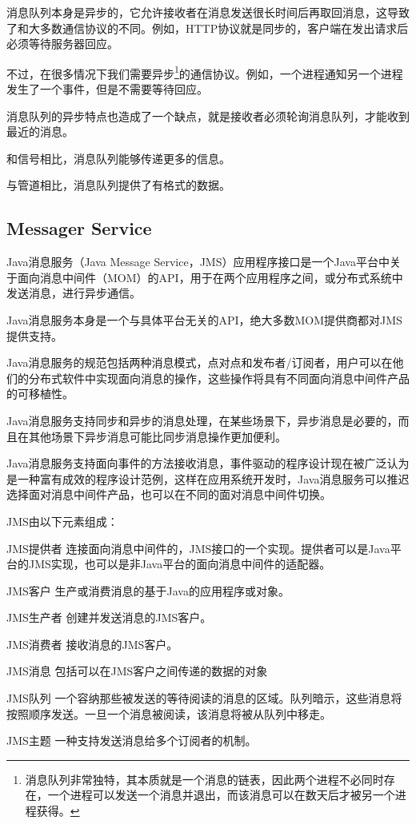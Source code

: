 消息队列本身是异步的，它允许接收者在消息发送很长时间后再取回消息，这导致了和大多数通信协议的不同。例如，HTTP协议就是同步的，客户端在发出请求后必须等待服务器回应。

不过，在很多情况下我们需要异步\footnote{消息队列非常独特，其本质就是一个消息的链表，因此两个进程不必同时存在，一个进程可以发送一个消息并退出，而该消息可以在数天后才被另一个进程获得。}的通信协议。例如，一个进程通知另一个进程发生了一个事件，但是不需要等待回应。

消息队列的异步特点也造成了一个缺点，就是接收者必须轮询消息队列，才能收到最近的消息。

\begin{compactitem}
\item 和信号相比，消息队列能够传递更多的信息。
\item 与管道相比，消息队列提供了有格式的数据。
\end{compactitem}


\subsection{Messager Service}

Java消息服务（Java Message Service，JMS）应用程序接口是一个Java平台中关于面向消息中间件（MOM）的API，用于在两个应用程序之间，或分布式系统中发送消息，进行异步通信。

Java消息服务本身是一个与具体平台无关的API，绝大多数MOM提供商都对JMS提供支持。

Java消息服务的规范包括两种消息模式，点对点和发布者/订阅者，用户可以在他们的分布式软件中实现面向消息的操作，这些操作将具有不同面向消息中间件产品的可移植性。

Java消息服务支持同步和异步的消息处理，在某些场景下，异步消息是必要的，而且在其他场景下异步消息可能比同步消息操作更加便利。

Java消息服务支持面向事件的方法接收消息，事件驱动的程序设计现在被广泛认为是一种富有成效的程序设计范例，这样在应用系统开发时，Java消息服务可以推迟选择面对消息中间件产品，也可以在不同的面对消息中间件切换。

JMS由以下元素组成：

\begin{compactitem}
\item JMS提供者
连接面向消息中间件的，JMS接口的一个实现。提供者可以是Java平台的JMS实现，也可以是非Java平台的面向消息中间件的适配器。
\item JMS客户
生产或消费消息的基于Java的应用程序或对象。
\item JMS生产者
创建并发送消息的JMS客户。
\item JMS消费者
接收消息的JMS客户。
\item JMS消息
包括可以在JMS客户之间传递的数据的对象
\item JMS队列
一个容纳那些被发送的等待阅读的消息的区域。队列暗示，这些消息将按照顺序发送。一旦一个消息被阅读，该消息将被从队列中移走。
\item JMS主题
一种支持发送消息给多个订阅者的机制。
\end{compactitem}

